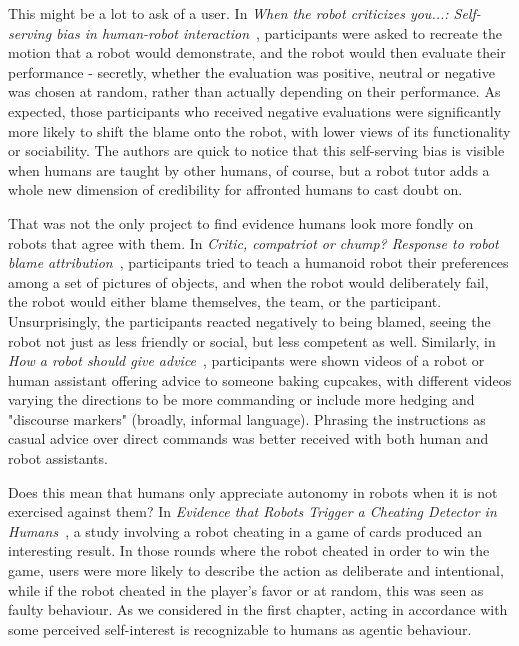 \documentclass{sfuthesis}
\begin{document}
This might be a lot to ask of a user. In \textit{When the robot criticizes you...: Self-serving bias in human-robot interaction}~\cite{you2011robot}, participants were asked to recreate the motion that a robot would demonstrate, and the robot would then evaluate their performance - secretly, whether the evaluation was positive, neutral or negative was chosen at random, rather than actually depending on their performance. As expected, those participants who received negative evaluations were significantly more likely to shift the blame onto the robot, with lower views of its functionality or sociability. The authors are quick to notice that this self-serving bias is visible when humans are taught by other humans, of course, but a robot tutor adds a whole new dimension of credibility for affronted humans to cast doubt on.

That was not the only project to find evidence humans look more fondly on robots that agree with them. In \textit{Critic, compatriot or chump? Response to robot blame attribution}~\cite{groom2010critic}, participants tried to teach a humanoid robot their preferences among a set of pictures of objects, and when the robot would deliberately fail, the robot would either blame themselves, the team, or the participant. Unsurprisingly, the participants reacted negatively to being blamed, seeing the robot not just as less friendly or social, but less competent as well. Similarly, in \textit{How a robot should give advice}~\cite{torrey2013robot}, participants were shown videos of a robot or human assistant offering advice to someone baking cupcakes, with different videos varying the directions to be more commanding or include more hedging and "discourse markers" (broadly, informal language). Phrasing the instructions as casual advice over direct commands was better received with both human and robot assistants.

Does this mean that humans only appreciate autonomy in robots when it is not exercised against them? In \textit{Evidence that Robots Trigger a Cheating Detector in Humans}~\cite{litoiu2015evidence}, a study involving a robot cheating in a game of cards produced an interesting result. In those rounds where the robot cheated in order to win the game, users were more likely to describe the action as deliberate and intentional, while if the robot cheated in the player's favor or at random, this was seen as faulty behaviour. As we considered in the first chapter, acting in accordance with some perceived self-interest is recognizable to humans as agentic behaviour.	
\end{document}
